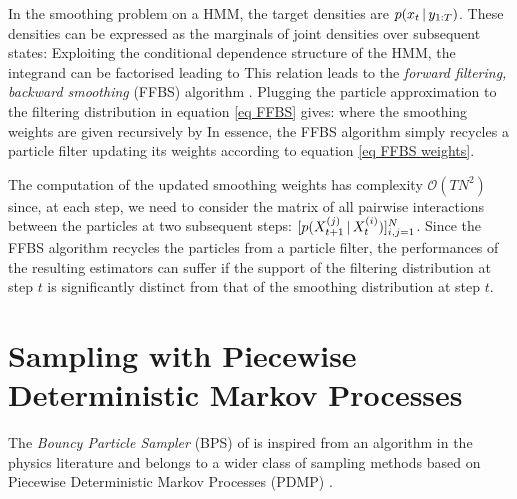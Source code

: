 In the smoothing problem on a HMM, the target densities are $p(x_t\,|\, y_{1:T})$. These densities can be expressed as the marginals of joint densities over subsequent states: 
 Exploiting the conditional dependence structure of the HMM, the integrand can be factorised leading to
This relation leads to the \emph{forward filtering, backward smoothing} (FFBS) algorithm \citep{hurzeler98, doucet00}.
Plugging the particle approximation to the filtering distribution in equation \eqref{eq FFBS} gives:
where the smoothing weights are given recursively by
In essence, the FFBS algorithm simply recycles a particle filter updating its weights according to equation \eqref{eq FFBS weights}. 

The computation of the updated smoothing weights has complexity $\mathcal O(TN^{2})$ since, at each step, we need to consider the matrix of all pairwise interactions between the particles at two subsequent steps: $[p(X^{(j)}_{t+1}\,|\, X^{(i)}_{t})]_{i,j=1}^{N}$. Since the FFBS algorithm recycles the particles from a particle filter, the performances of the resulting estimators can suffer if the support of the filtering distribution at step $t$ is significantly distinct from that of the smoothing distribution at step $t$.




\section{\label{point:BPS}Sampling with Piecewise Deterministic Markov Processes}
The \emph{Bouncy Particle Sampler} (BPS) of \citet{bouchard15} is inspired from an algorithm in the physics literature \citep{peters12} and belongs to a wider class of sampling methods based on Piecewise Deterministic Markov Processes (PDMP) \citep{bierkens16, bierkens17, wu17, vanetti17}.

